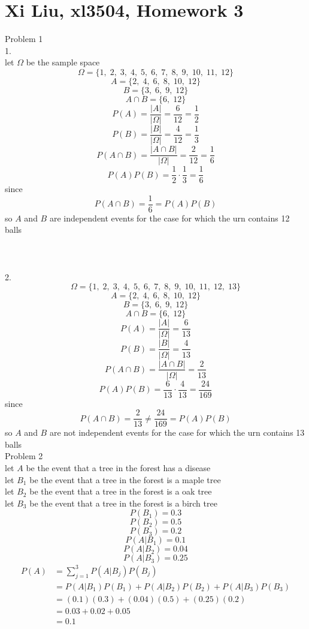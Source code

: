 \documentclass[12pt,border=4pt,multi]{article}%
\begin{document}
\section*{Xi Liu, xl3504, Homework 3}
Problem 1\\
1.\\
let $\Omega$ be the sample space
\[\Omega = \{1,\; 2,\; 3,\; 4,\; 5,\; 6,\; 7,\; 8,\; 9,\; 10,\; 11,\; 12\}\]
\[A = \{2,\; 4,\; 6,\; 8,\; 10,\; 12\}\]
\[B = \{3,\; 6,\; 9,\; 12\}\]
\[A \cap B = \{6,\; 12\}\]
\[P(A) = \frac{|A|}{|\Omega|} = \frac{6}{12} = \frac{1}{2}\]
\[P(B) = \frac{|B|}{|\Omega|} = \frac{4}{12} = \frac{1}{3}\]
\[P(A \cap B) = \frac{|A \cap B|}{|\Omega|} = \frac{2}{12} = \frac{1}{6}\]
\[P(A)P(B) = \frac{1}{2}\cdot\frac{1}{3} = \frac{1}{6}\]
since 
\[P(A \cap B) = \frac{1}{6} = P(A)P(B)\]
so $A$ and $B$ are independent events for the case for which the urn contains 12 balls\\
\\
\\
\\
2.\\
\[\Omega = \{1,\; 2,\; 3,\; 4,\; 5,\; 6,\; 7,\; 8,\; 9,\; 10,\; 11,\; 12,\; 13\}\]
\[A = \{2,\; 4,\; 6,\; 8,\; 10,\; 12\}\]
\[B = \{3,\; 6,\; 9,\; 12\}\]
\[A \cap B = \{6,\; 12\}\]
\[P(A) = \frac{|A|}{|\Omega|} = \frac{6}{13}\]
\[P(B) = \frac{|B|}{|\Omega|} = \frac{4}{13}\]
\[P(A \cap B) = \frac{|A \cap B|}{|\Omega|} = \frac{2}{13}\]
\[P(A)P(B) = \frac{6}{13}\cdot\frac{4}{13} = \frac{24}{169}\]
since 
\[P(A \cap B) = \frac{2}{13} \not= \frac{24}{169} = P(A)P(B)\]
so $A$ and $B$ are not independent events for the case for which the urn contains 13 balls\\
\newpage
\noindent
Problem 2\\
let $A$ be the event that a tree in the forest has a disease\\
let $B_1$ be the event that a tree in the forest is a maple tree\\
let $B_2$ be the event that a tree in the forest is a oak tree\\
let $B_3$ be the event that a tree in the forest is a birch tree\\
\[P(B_1) = 0.3\]
\[P(B_2) = 0.5\]
\[P(B_3) = 0.2\]
\[P(A | B_1) = 0.1\]
\[P(A | B_2) = 0.04\]
\[P(A | B_3) = 0.25\]
\begin{align*}
    P(A) &= \sum_{j = 1}^3 P(A | B_j)P(B_j)\\
    &= P(A | B_1)P(B_1) + P(A | B_2)P(B_2) + P(A | B_3)P(B_3)\\
    &= (0.1)(0.3) + (0.04)(0.5) + (0.25)(0.2)\\
    &= 0.03 + 0.02 + 0.05\\
    &= 0.1\\
\end{align*}
\end{document}
